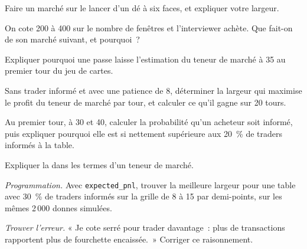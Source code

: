 \begin{exercise}[$\star$]\label{exo:m2:market-making-games:1}
Faire un marché sur le lancer d'un dé à six faces, et expliquer votre largeur.
\end{exercise}

\begin{exercise}[$\star$]\label{exo:m2:market-making-games:2}
On cote 200 à 400 sur le nombre de fenêtres et l'interviewer achète. Que fait-on
de son marché suivant, et pourquoi~?
\end{exercise}

\begin{exercise}[$\star$]\label{exo:m2:market-making-games:3}
Expliquer pourquoi une passe laisse l'estimation du teneur de marché à 35 au premier tour du jeu de cartes.
\end{exercise}

\begin{exercise}[$\star\star$]\label{exo:m2:market-making-games:4}
Sans trader informé et avec une patience de 8, déterminer la largeur qui maximise le
profit du teneur de marché par tour, et calculer ce qu'il gagne sur 20 tours.
\end{exercise}

\begin{exercise}[$\star\star$]\label{exo:m2:market-making-games:5}
Au premier tour, à 30 et 40, calculer la probabilité qu'un acheteur soit informé, puis
expliquer pourquoi elle est si nettement supérieure aux 20~\% de traders informés à la table.
\end{exercise}

\begin{exercise}[$\star\star$]\label{exo:m2:market-making-games:6}
Expliquer la  dans les termes d'un teneur de marché.
\end{exercise}

\begin{exercise}[$\star\star\star$]\label{exo:m2:market-making-games:7}
\emph{Programmation.} Avec \texttt{expected\_pnl}, trouver la meilleure largeur pour une table
avec 30~\% de traders informés sur la grille de 8 à 15 par demi-points, sur les mêmes 2\,000 donnes simulées.
\end{exercise}

\begin{exercise}[$\star\star\star$]\label{exo:m2:market-making-games:8}
\emph{Trouver l'erreur.} « Je cote serré pour trader davantage~: plus de transactions
rapportent plus de fourchette encaissée.~» Corriger ce raisonnement.
\end{exercise}

